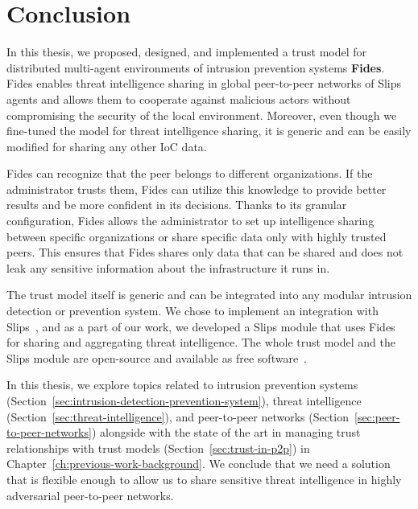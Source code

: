 \chapter{Conclusion}
\label{ch:conclusion}

In this thesis, we proposed, designed, and implemented a trust model for distributed multi-agent environments of intrusion prevention systems \textbf{Fides}.
Fides enables threat intelligence sharing in global peer-to-peer networks of Slips agents and allows them to cooperate against malicious actors without compromising the security of the local environment. 
Moreover, even though we fine-tuned the model for threat intelligence sharing, it is generic and can be easily modified for sharing any other IoC data.

Fides can recognize that the peer belongs to different organizations. If the administrator trusts them, Fides can utilize this knowledge to provide better results and be more confident in its decisions.
Thanks to its granular configuration, Fides allows the administrator to set up intelligence sharing between specific organizations or share specific data only with highly trusted peers.
This ensures that Fides shares only data that can be shared and does not leak any sensitive information about the infrastructure it runs in.

The trust model itself is generic and can be integrated into any modular intrusion detection or prevention system. We chose to implement an integration with Slips~\cite{slips}, and as a part of our work, we developed a Slips module that uses Fides for sharing and aggregating threat intelligence.
The whole trust model and the Slips module are open-source and available as free software~\cite{fidesGithub}.

In this thesis, we explore topics related to intrusion prevention systems (Section~\ref{sec:intrusion-detection-prevention-system}), threat intelligence (Section~\ref{sec:threat-intelligence}), and peer-to-peer networks (Section~\ref{sec:peer-to-peer-networks}) alongside with the state of the art in managing trust relationships with trust models (Section~\ref{sec:trust-in-p2p}) in Chapter~\ref{ch:previous-work-background}.
We conclude that we need a solution that is flexible enough to allow us to share sensitive threat intelligence in highly adversarial peer-to-peer networks.

